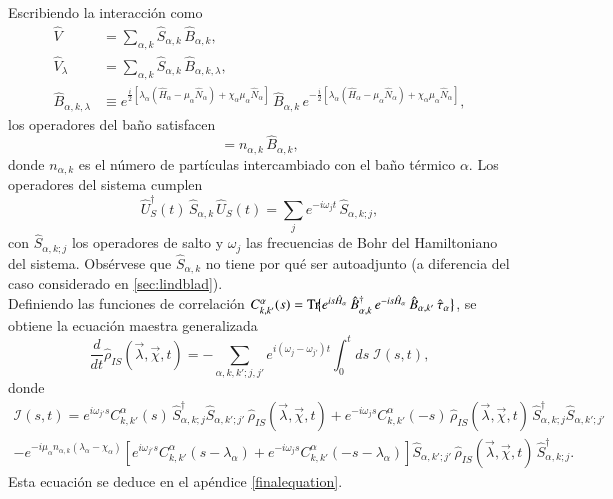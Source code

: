Escribiendo la interacción como
\begin{align*}
    \hat{V} &= \sum_{\alpha,k}\hat{S}_{\alpha,k}\,\hat{B}_{\alpha,k}, \\
    \hat{V}_{\lambda} &= \sum_{\alpha,k}\hat{S}_{\alpha,k}\,\hat{B}_{\alpha,k,\lambda}, \\
    \hat{B}_{\alpha,k,\lambda} 
      &\equiv e^{\frac{i}{2}[\lambda_{\alpha}(\hat{H}_{\alpha} - \mu_{\alpha}\hat{N}_{\alpha}) + \chi_{\alpha}\mu_{\alpha}\hat{N}_{\alpha}]}\,
               \hat{B}_{\alpha,k}\,
               e^{-\frac{i}{2}[\lambda_{\alpha}(\hat{H}_{\alpha} - \mu_{\alpha}\hat{N}_{\alpha}) + \chi_{\alpha}\mu_{\alpha}\hat{N}_{\alpha}]},
\end{align*}
los operadores del baño satisfacen
\begin{equation*}
    [\hat{B}_{\alpha,k},\hat{N}_{\alpha}] = n_{\alpha,k}\,\hat{B}_{\alpha,k},
\end{equation*}
donde \(n_{\alpha,k}\) es el número de partículas intercambiado con el baño térmico \(\alpha\). Los operadores del sistema cumplen
\begin{equation*}
    \hat{U}^{\dagger}_{S}(t)\,\hat{S}_{\alpha,k}\,\hat{U}_{S}(t) 
    = \sum_{j} e^{-i\omega_{j}t}\,\hat{S}_{\alpha,k;j},
\end{equation*}
con \(\hat{S}_{\alpha,k;j}\) los operadores de salto y \(\omega_{j}\) las frecuencias de Bohr del Hamiltoniano del sistema. Obsérvese que \(\hat{S}_{\alpha,k}\) no tiene por qué ser autoadjunto (a diferencia del caso considerado en \ref{sec:lindblad}).
\\

Definiendo las funciones de correlación 
\(C^{\alpha}_{k,k'}(s)=\textnormal{Tr}\!\big\{e^{is\hat{H}_{\alpha}}\,\hat{B}^{\dagger}_{\alpha,k}\,e^{-is\hat{H}_{\alpha}}\,\hat{B}_{\alpha,k'}\,\hat{\tau}_{\alpha}\big\}\),
se obtiene la ecuación maestra generalizada
\begin{equation}
    \frac{d}{dt}\hat{\rho}_{IS}(\vec{\lambda},\vec{\chi},t)
    = - \sum_{\alpha,k,k';j,j'} e^{i(\omega_{j}-\omega_{j'})t}
      \int_{0}^{t}\!ds\; \mathcal{I}(s,t),
    \label{ecmaestrafinal}
\end{equation}
donde
\begin{multline}
    \mathcal{I}(s,t) 
    = e^{i\omega_{j'}s} C^{\alpha}_{k,k'}(s)\,
      \hat{S}^{\dagger}_{\alpha,k;j}\hat{S}_{\alpha,k';j'}\,
      \hat{\rho}_{IS}(\vec{\lambda},\vec{\chi},t)
      + e^{-i\omega_{j}s} C^{\alpha}_{k,k'}(-s)\,
        \hat{\rho}_{IS}(\vec{\lambda},\vec{\chi},t)\,
        \hat{S}^{\dagger}_{\alpha,k;j}\hat{S}_{\alpha,k';j'} \\
    - e^{-i\mu_{\alpha}n_{\alpha,k}(\lambda_{\alpha}-\chi_{\alpha})}
      \!\left[
        e^{i\omega_{j'}s} C^{\alpha}_{k,k'}(s-\lambda_{\alpha})
      + e^{-i\omega_{j}s} C^{\alpha}_{k,k'}(-s-\lambda_{\alpha})
      \right]
      \hat{S}_{\alpha,k';j'}\,
      \hat{\rho}_{IS}(\vec{\lambda},\vec{\chi},t)\,
      \hat{S}^{\dagger}_{\alpha,k;j}.
    \label{ecmaestrafinalI}
\end{multline}
Esta ecuación se deduce en el apéndice \ref{finalequation}.
\label{sec2:master}

